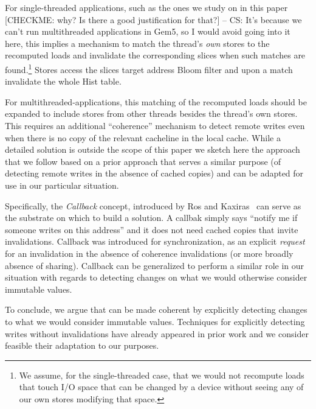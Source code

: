 For single-threaded applications, {\color{blue} such as the ones we study on in this paper} {\color{red} [CHECKME: why? Is there a good justification for that?] -- CS: It's because we can't run multithreaded applications in Gem5, so I would avoid going into it here}, this implies a mechanism to match the thread's \emph{own} stores to the recomputed loads and invalidate the corresponding {\recomp} slices when such matches are found.\footnote{We assume, for the single-threaded case, that we would not recompute loads that touch I/O space that can be changed by a device without seeing any of our own stores modifying that space.} 
{\color{magenta} Stores access the {\recomp} slices target address Bloom filter and upon a match invalidate the whole Hist table.}

For multithreaded-applications, this matching of the recomputed loads should be expanded to include stores from other threads besides the thread's own stores. This requires an additional ``coherence'' mechanism to detect remote writes even when there is no copy of the relevant cacheline in the local cache. While a detailed solution is outside the scope of this paper we sketch here the approach that we follow based on a prior approach that serves a similar purpose (of detecting remote writes in the absence of cached copies) and can be adapted for use in our particular situation. 

Specifically, the \emph{Callback} concept, introduced by Ros and Kaxiras~\cite{aros-isca15} can serve as the substrate on which to build a solution. A callbak simply says ``notify me if someone writes on this address'' and it does not need cached copies that invite invalidations. Callback was introduced for synchronization, as an explicit \emph{request} for an invalidation in the absence of coherence invalidations (or more broadly absence of sharing). Callback can be generalized to perform a similar role in our situation with regards to detecting changes on what we would otherwise consider immutable values. 


To conclude, we argue that {\recomp} can be made coherent by explicitly detecting changes to what we would consider immutable values. Techniques for explicitly detecting writes without invalidations have already appeared in prior work and we consider feasible their adaptation to our purposes.

